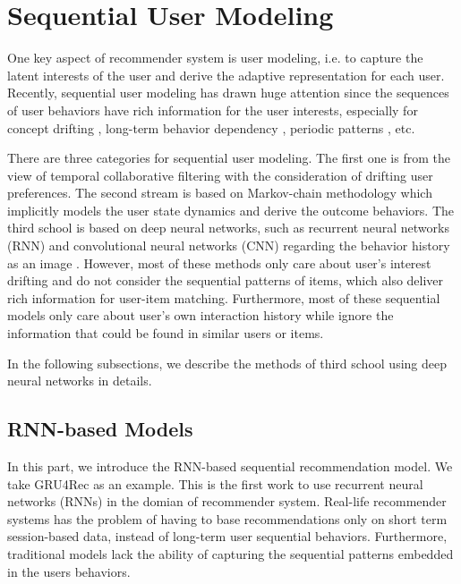 \section{Sequential User Modeling}
One key aspect of recommender system is user modeling, i.e. to capture the latent interests of the user and derive the adaptive representation for each user\cite{zhou2018deepa,zheng2017joint}.
Recently, sequential user modeling has drawn huge attention since the sequences of user behaviors have rich information for the user interests, especially for concept drifting \cite{widmer1996learning}, long-term behavior dependency \cite{koren2009collaborative,ren2019lifelong}, periodic patterns \cite{ren2018repeatnet}, etc.

There are three categories for sequential user modeling.
The first one is from the view of temporal collaborative filtering \cite{koren2009collaborative} with the consideration of drifting user preferences.
The second stream is based on Markov-chain methodology \cite{rendle2010factorizing,he2016fusing,he2016vista} which implicitly models the user state dynamics and derive the outcome behaviors.
The third school is based on deep neural networks, such as recurrent neural networks (RNN) \cite{hidasi2015session,hidasi2017recurrent,wu2017recurrent,jing2017neural,liu2016context,beutel2018latent,villatel2018recurrent} and convolutional neural networks (CNN) regarding the behavior history as an image \cite{tang2018personalized,kang2018self}.
However, most of these methods only care about user's interest drifting and do not consider the sequential patterns of items, which also deliver rich information for user-item matching.
Furthermore, most of these sequential models only care about user's own interaction history while ignore the information that could be found in similar users or items.

In the following subsections, we describe the methods of third school using deep neural
networks in details.
\subsection{RNN-based Models}
In this part, we introduce the RNN-based sequential recommendation model. We take
GRU4Rec \cite{hidasi2015session} as an example. This is the first work to use
recurrent neural networks (RNNs) in the domian of recommender system. Real-life 
recommender systems has the problem of having to base recommendations only on 
short term session-based data, instead of long-term user sequential behaviors.
Furthermore, traditional models lack the ability of capturing the sequential 
patterns embedded in the users behaviors.

